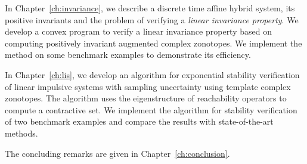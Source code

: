 In Chapter~\ref{ch:invariance}, we describe a discrete time affine
hybrid system, its positive invariants and the problem of verifying a
\emph{linear invariance property}.  We develop a convex program to
verify a linear invariance property based on computing positively
invariant augmented complex zonotopes.  We implement the method on
some benchmark examples to demonstrate its efficiency.

In Chapter~\ref{ch:lis}, we develop an algorithm for exponential
stability verification of linear impulsive systems with sampling
uncertainty using template complex zonotopes.  The algorithm uses the
eigenstructure of reachability operators to compute a contractive set.
We implement the algorithm for stability verification of two benchmark
examples and compare the results with state-of-the-art methods.

The concluding remarks are given in Chapter~\ref{ch:conclusion}.


